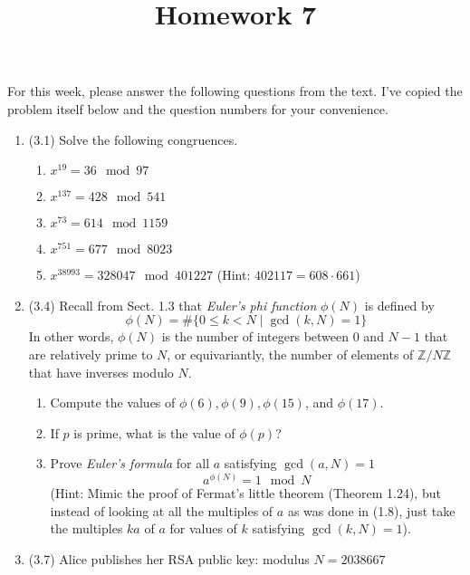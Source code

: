 \documentclass[12pt]{amsart}
\theoremstyle{definition}
\begin{document}
\title{Homework 7}

\maketitle

For this week, please answer the following questions from the text. 
I've copied the problem itself below and the question numbers for 
your convenience. 

\begin{enumerate}
	\item (3.1) Solve the following congruences. 
	\begin{enumerate}
		\item $x^{19} = 36 \mod 97$ 
		\item $x^{137} = 428 \mod 541$ 
		\item $x^{73} = 614 \mod 1159$ 
		\item $x^{751} = 677 \mod 8023$ 
		\item $x^{38993} = 328047 \mod 401227$ (Hint: $402117 = 
			608 \cdot 661$)
	\end{enumerate}
	\item (3.4) Recall from Sect. 1.3 that \textit{Euler's phi function} 
		$\phi(N)$ is defined by 
	\begin{displaymath}
		\phi(N) = \# \lbrace 0 \leq k < N \mid \operatorname{gcd}(
		k,N) = 1 \rbrace
	\end{displaymath}
		In other words, $\phi(N)$ is the number of integers between 
		$0$ and $N-1$ that are relatively prime to $N$, or 
		equivariantly, the number of elements of $\mathbb{Z}/N\mathbb{Z}$ 
		that have inverses modulo $N$. 
	\begin{enumerate}
		\item Compute the values of $\phi(6), \phi(9), \phi(15)$, 
			and $\phi(17)$. 
		\item If $p$ is prime, what is the value of $\phi(p)$? 
		\item Prove \textit{Euler's formula} for all $a$ satisfying 
			$\operatorname{gcd}(a,N) = 1$
		\begin{displaymath}
			a^{\phi(N)} = 1 \mod N 
		\end{displaymath}
			(Hint: Mimic the proof of Fermat's little theorem 
			(Theorem 1.24), but instead of looking at all the 
			multiples of $a$ as was done in (1.8), just take the 
			multiples $ka$ of $a$ for values of $k$ satisfying 
			$\operatorname{gcd}(k,N)=1$). 
	\end{enumerate}
	\item (3.7) Alice publishes her RSA public key: modulus $N = 2038667$  

\end{enumerate}
\end{document}
